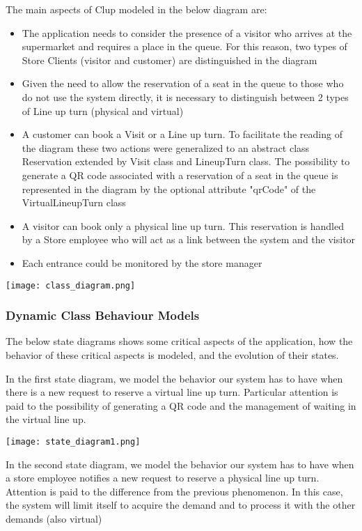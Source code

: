 The main aspects of Clup modeled in the below diagram are:
\begin{itemize}
    \item The application needs to consider the presence of a visitor who arrives at the supermarket and requires a place in the queue. For this reason, two types of Store Clients (visitor and customer) are distinguished in the diagram
    \item Given the need to allow the reservation of a seat in the queue to those who do not use the system directly, it is necessary to distinguish between 2 types of Line up turn (physical and virtual)
    \item A customer can book a Visit or a Line up turn. To facilitate the reading of the diagram these two actions were generalized to an abstract class Reservation extended by Visit class and LineupTurn class. The possibility to generate a QR code associated with a reservation of a seat in the queue is represented in the diagram by the optional attribute "qrCode" of the VirtualLineupTurn class
    \item A visitor can book only a physical line up turn. This reservation is handled by a Store employee who will act as a link between the system and the visitor
    \item Each entrance could be monitored by the store manager
\end{itemize}
\texttt{[image: class\_diagram.png]}


\subsubsection{Dynamic Class Behaviour Models}
The below state diagrams shows some critical aspects of the application, how the behavior of these critical aspects is modeled, and the evolution of their states.

\medskip
In the first state diagram, we model the behavior our system has to have when there is a new request to reserve a virtual line up turn. Particular attention is paid to the possibility of generating a QR code and the management of waiting in the virtual line up.

\medskip
\texttt{[image: state\_diagram1.png]}

\medskip
In the second state diagram, we model the behavior our system has to have when a store employee notifies a new request to reserve a physical line up turn. Attention is paid to the difference from the previous phenomenon. In this case, the system will limit itself to acquire the demand and to process it with the other demands (also virtual)

